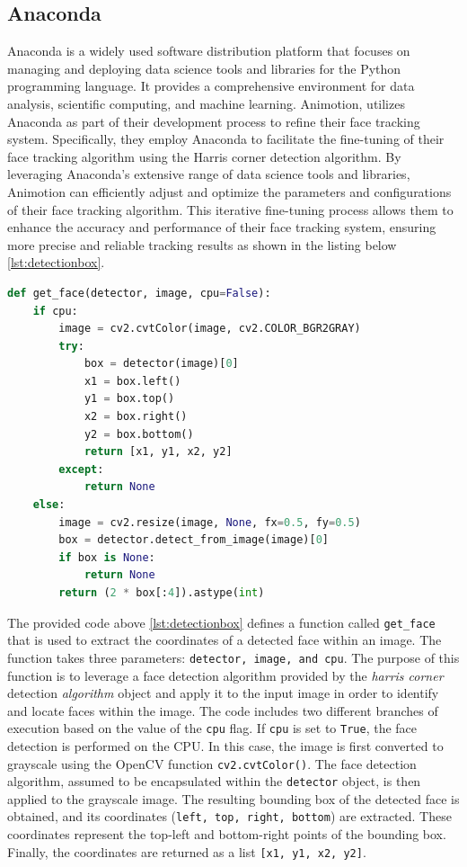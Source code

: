 \subsection{Anaconda}
Anaconda is a widely used software distribution platform that focuses on managing and deploying 
data science tools and libraries for the Python programming language. It provides a comprehensive environment 
for data analysis, scientific computing, and machine learning. \cite{anaconda}
Animotion, utilizes Anaconda as part of their development process to refine their face tracking system. 
Specifically, they employ Anaconda to facilitate the fine-tuning of their face tracking algorithm 
using the Harris corner detection algorithm.
By leveraging Anaconda's extensive range of data science tools and libraries, Animotion can 
efficiently adjust and optimize the parameters and configurations of their face tracking algorithm. 
This iterative fine-tuning process allows them to enhance the accuracy and performance of their face tracking system, 
ensuring more precise and reliable tracking results as shown in the listing below \ref{lst:detectionbox}. 

\begin{lstlisting}[language=Python,caption=detecting the face in a box shaped object,label=lst:detectionbox]
    def get_face(detector, image, cpu=False):
    if cpu:
        image = cv2.cvtColor(image, cv2.COLOR_BGR2GRAY)
        try:
            box = detector(image)[0]
            x1 = box.left()
            y1 = box.top()
            x2 = box.right()
            y2 = box.bottom()
            return [x1, y1, x2, y2]
        except:
            return None
    else:
        image = cv2.resize(image, None, fx=0.5, fy=0.5)
        box = detector.detect_from_image(image)[0]
        if box is None:
            return None
        return (2 * box[:4]).astype(int)
\end{lstlisting}

The provided code above \ref{lst:detectionbox} defines a function called \texttt{get\_face} that is used to extract the coordinates of a detected face within an image. 
The function takes three parameters: \texttt{detector, image, and cpu}.
The purpose of this function is to leverage a face detection algorithm provided 
by the \emph{harris corner} detection \emph{algorithm} object and apply it to the input image in order to identify 
and locate faces within the image. The code includes two different branches of execution based on the value of the \texttt{cpu} flag.
If \texttt{cpu} is set to \texttt{True}, the face detection is performed on the CPU. 
In this case, the image is first converted to grayscale using the OpenCV function \texttt{cv2.cvtColor()}. 
The face detection algorithm, assumed to be encapsulated within the \texttt{detector} object, is then applied to the grayscale image. 
The resulting bounding box of the detected face is obtained, and its coordinates (\texttt{left, top, right, bottom}) are extracted. 
These coordinates represent the top-left and bottom-right points of the bounding box. Finally, the coordinates are returned as a list \texttt{[x1, y1, x2, y2]}.

